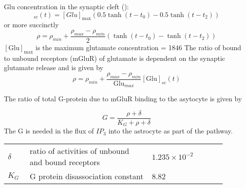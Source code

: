 \documentclass[fleqn]{report}
\numberwithin{equation}{section}
\numberwithin{equation}{section}
\newcommand{\Glu}{\text{Glu}}
\newcommand{\Ca}{\text{Ca$^{2+}$}}
\begin{document}
					Glu concentration in the synaptic cleft (\uM):
					\begin{equation}
						[Glu]_{sc}(t) = [Glu]_{\max} \left( 0.5 \tanh\left(t - t_0\right) - 0.5 \tanh\left(t - t_2\right) \right)	
							\end{equation}	
							or more succinctly
								\begin{equation*}
										\rho=\rho_{min}+\frac{\rho_{max}-\rho_{min}}{2}\left(\tanh\left(t - t_0\right) - \tanh\left(t - t_2\right) \right)
										\end{equation*}
			 $[\Glu]_{\max} $	is the maximum glutamate concentration 	= 1846 \uM  \citep{Santucci2008}
			 			The ratio of bound to unbound receptors (mGluR) of glutamate is dependent on the synaptic glutamate release and is given by 
			 			\begin{equation*}
			 			\rho=\rho_{min}+\frac{\rho_{max}-\rho_{min}}{\Glu_{max}}[\Glu]_{sc}(t)
			 			\end{equation*}
			  
		The ratio of total G-protein due to mGluR binding to the asytocyte is given by
		
		\begin{equation}\label{eq:G}
		G=\frac{\rho+\delta}{K_{G}+\rho+\delta}
		\end{equation}
		The G is needed in the flux of $IP_{3}$ into the astrocyte as part of the \Ca pathway. 
		\begin{table}[h!]
				\centering
				\begin{tabular}{ p{0.09\linewidth}  >{\footnotesize} p{0.5\linewidth}  >{\footnotesize} p{0.27\linewidth} >{\footnotesize} p{0.03\linewidth} }
				\hline
				$\delta$ 			& ratio of activities of unbound and bound receptors	& $1.235 \times 10^{-2}$ &    \\
				$K_{G}$ 			& G protein disassociation constant	& 8.82&   \\
				\hline
				\end{tabular}
				\end{table}
		
\end{document}
